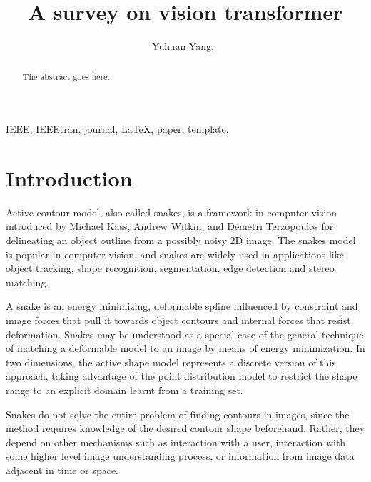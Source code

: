 \documentclass[journal]{IEEEtran}
\begin{document}
\title{A survey on vision transformer}

\author{Yuhuan Yang,~}

\maketitle

\begin{abstract}
The abstract goes here.
\end{abstract}

\begin{IEEEkeywords}
IEEE, IEEEtran, journal, \LaTeX, paper, template.
\end{IEEEkeywords}

\IEEEpeerreviewmaketitle

\section{Introduction\cite{w}}
Active contour model, also called snakes, is a framework in computer vision introduced by Michael Kass, Andrew Witkin, and Demetri Terzopoulos\cite{snake} for delineating an object outline from a possibly noisy 2D image. The snakes model is popular in computer vision, and snakes are widely used in applications like object tracking, shape recognition, segmentation, edge detection and stereo matching.

A snake is an energy minimizing, deformable spline influenced by constraint and image forces that pull it towards object contours and internal forces that resist deformation. Snakes may be understood as a special case of the general technique of matching a deformable model to an image by means of energy minimization.\cite{snake} In two dimensions, the active shape model represents a discrete version of this approach, taking advantage of the point distribution model to restrict the shape range to an explicit domain learnt from a training set.

Snakes do not solve the entire problem of finding contours in images, since the method requires knowledge of the desired contour shape beforehand. Rather, they depend on other mechanisms such as interaction with a user, interaction with some higher level image understanding process, or information from image data adjacent in time or space.
\end{document}
